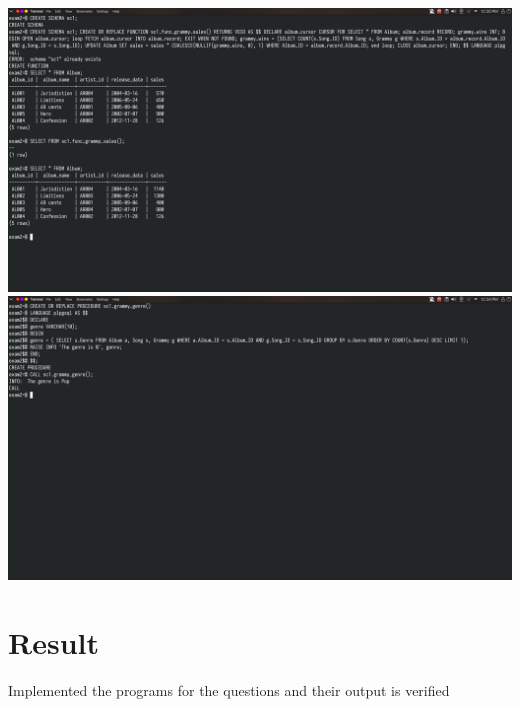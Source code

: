 \documentclass[13pt,oneside]{book}
\begin{document}
\begin{itemize}
\begin{verbatim}
\end{verbatim}
\includegraphics[width=\textwidth]{img/q/9.png}
\includegraphics[width=\textwidth]{img/q/9.2.png}

\end{itemize}

\section*{Result}
Implemented the programs for the questions and their output is verified
\end{document}
